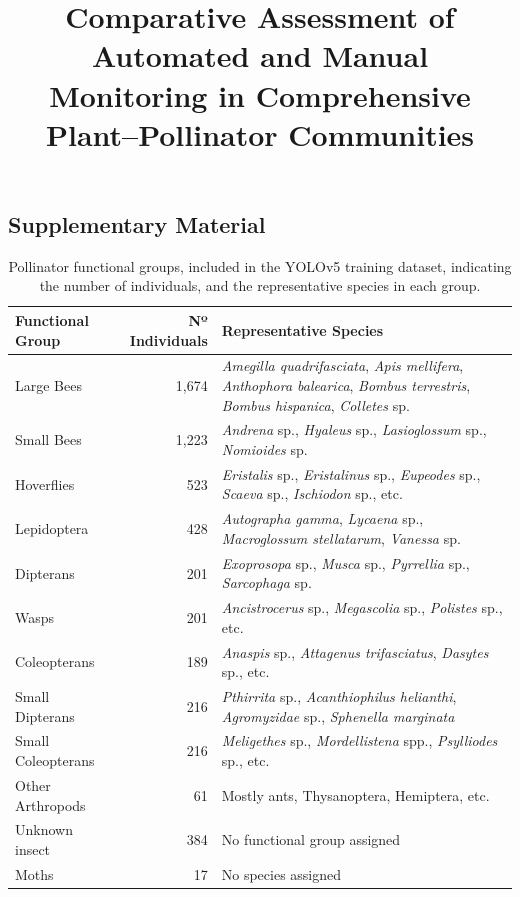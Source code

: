 \documentclass[]{article}
\date{}
\title{Comparative Assessment of Automated and Manual Monitoring in Comprehensive Plant–Pollinator Communities}
\renewcommand{\(}{\left(}
\renewcommand{\)}{\right)}
\renewcommand{\[}{\left[}
\renewcommand{\]}{\right]}
\begin{document}
\maketitle

\subsection*{Supplementary Material}





\begin{table}[h!]
\centering
\caption{Pollinator functional groups, included in the YOLOv5 training dataset, indicating the number of individuals, and the representative species in each group.}
\label{tab_sup_1}
\small
\begin{tabular}{l r p{8cm}}
\toprule
\textbf{Functional Group} & \textbf{Nº Individuals}& \textbf{Representative Species} \\
\midrule
Large Bees                & 1,674  & \textit{Amegilla quadrifasciata}, \textit{Apis mellifera}, \textit{Anthophora balearica}, \textit{Bombus terrestris}, \textit{Bombus hispanica}, \textit{Colletes} sp. \\
Small Bees                & 1,223  & \textit{Andrena} sp., \textit{Hyaleus} sp., \textit{Lasioglossum} sp., \textit{Nomioides} sp. \\
Hoverflies                & 523    & \textit{Eristalis} sp., \textit{Eristalinus} sp., \textit{Eupeodes} sp., \textit{Scaeva} sp., \textit{Ischiodon} sp., etc. \\
Lepidoptera               & 428    & \textit{Autographa gamma}, \textit{Lycaena} sp., \textit{Macroglossum stellatarum}, \textit{Vanessa} sp. \\
Dipterans                 & 201    & \textit{Exoprosopa} sp., \textit{Musca} sp., \textit{Pyrrellia} sp., \textit{Sarcophaga} sp. \\
Wasps                     & 201    & \textit{Ancistrocerus} sp., \textit{Megascolia} sp., \textit{Polistes} sp., etc. \\
Coleopterans              & 189    & \textit{Anaspis} sp., \textit{Attagenus trifasciatus}, \textit{Dasytes} sp., etc. \\
Small Dipterans           & 216    & \textit{Pthirrita} sp., \textit{Acanthiophilus helianthi}, \textit{Agromyzidae} sp., \textit{Sphenella marginata} \\
Small Coleopterans        & 216    & \textit{Meligethes} sp., \textit{Mordellistena} spp., \textit{Psylliodes} sp., etc. \\
Other Arthropods          & 61     & Mostly ants, Thysanoptera, Hemiptera, etc. \\
Unknown insect & 384    & No functional group assigned \\
Moths                     & 17     & No species assigned \\
\bottomrule
\end{tabular}
\label{yolo_dataset_pollinator_description}
\end{table}
\end{document}
